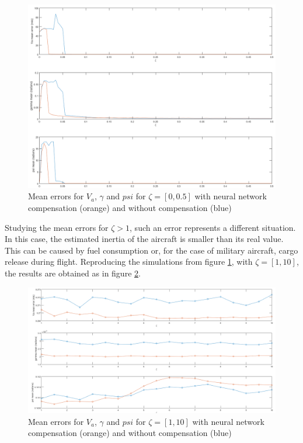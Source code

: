 \begin{figure}[h]
\centering
\includegraphics[width=1.1\textwidth]{Figures/Results/mean_error_xi.png}
\caption[Mean errors for $V_a$, $\gamma$ and $psi$]{Mean errors for $V_a$, $\gamma$ and $psi$ for $\zeta=[0,0.5]$ with neural network compensation (orange) and without compensation (blue)}
\label{fig:xi_mean_error}
\end{figure}

Studying the mean errors for $\zeta>1$, such an error represents a different situation. In this case, the estimated inertia of the aircraft is smaller than its real value. This can be caused by fuel consumption or, for the case of military aircraft, cargo release during flight. Reproducing the simulations from figure \ref{fig:xi_mean_error}, with $\zeta=[1,10]$, the results are obtained as in figure \ref{fig:xi_mean_error_big}.

\begin{figure}[H]
\centering
\includegraphics[width=1.1\textwidth]{Figures/Results/mean_error_xi_big.png}
\caption[Mean errors for $V_a$, $\gamma$ and $psi$ for larger values of $\zeta$ ]{Mean errors for $V_a$, $\gamma$ and $psi$ for $\zeta=[1,10]$ with neural network compensation (orange) and without compensation (blue)}
\label{fig:xi_mean_error_big}
\end{figure}

